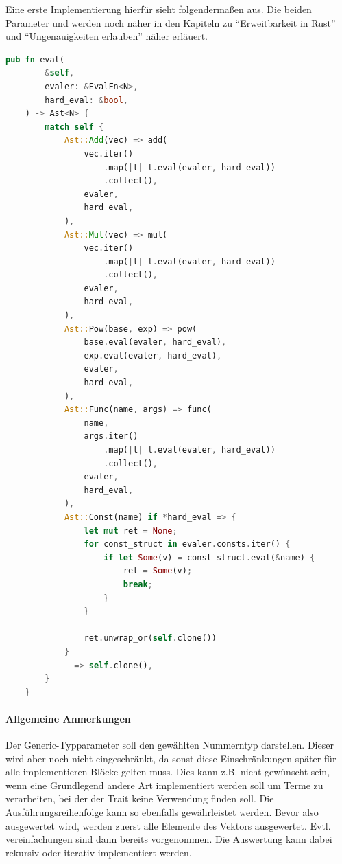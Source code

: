 \documentclass[11pt,a4paper, ngerman]{article}
\begin{document}
Eine erste Implementierung hierfür sieht folgendermaßen aus. Die beiden Parameter  und  werden noch näher in den Kapiteln zu ``Erweitbarkeit in Rust'' und ``Ungenauigkeiten erlauben'' näher erläuert.

\begin{lstlisting}[language=rust, caption={eval-Methode 1. Implementierung}]
pub fn eval(
        &self,
        evaler: &EvalFn<N>,
        hard_eval: &bool,
    ) -> Ast<N> {
        match self {
            Ast::Add(vec) => add(
                vec.iter()
                    .map(|t| t.eval(evaler, hard_eval))
                    .collect(),
                evaler,
                hard_eval,
            ),
            Ast::Mul(vec) => mul(
                vec.iter()
                    .map(|t| t.eval(evaler, hard_eval))
                    .collect(),
                evaler,
                hard_eval,
            ),
            Ast::Pow(base, exp) => pow(
                base.eval(evaler, hard_eval),
                exp.eval(evaler, hard_eval),
                evaler,
                hard_eval,
            ),
            Ast::Func(name, args) => func(
                name,
                args.iter()
                    .map(|t| t.eval(evaler, hard_eval))
                    .collect(),
                evaler,
                hard_eval,
            ),
            Ast::Const(name) if *hard_eval => {
                let mut ret = None;
                for const_struct in evaler.consts.iter() {
                    if let Some(v) = const_struct.eval(&name) {
                        ret = Some(v);
                        break;
                    }
                }

                ret.unwrap_or(self.clone())
            }
            _ => self.clone(),
        }
    }
\end{lstlisting}

\paragraph{Allgemeine Anmerkungen} Der Generic-Typparameter  soll den gewählten Nummerntyp darstellen. Dieser wird aber noch nicht eingeschränkt, da sonst diese Einschränkungen später für alle implementieren Blöcke gelten muss. Dies kann z.B. nicht gewünscht sein, wenn eine Grundlegend andere Art implementiert werden soll um Terme zu verarbeiten, bei der der Trait  keine Verwendung finden soll. Die Ausführungsreihenfolge kann so ebenfalls gewährleistet werden. Bevor also  ausgewertet wird, werden zuerst alle Elemente des Vektors ausgewertet. Evtl. vereinfachungen sind dann bereits vorgenommen. Die Auswertung kann dabei rekursiv oder iterativ implementiert werden.
\end{document}
